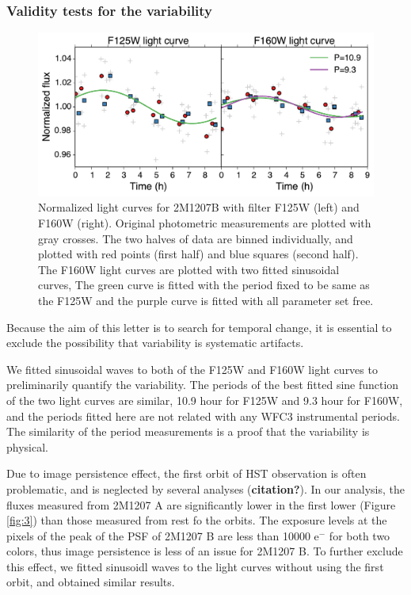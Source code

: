\documentclass[apj]{emulateapj}
\begin{document}
\subsubsection{Validity tests for the variability}

\begin{figure}
  \centering
  \includegraphics[width=\textwidth]{systematics}
  \caption{Normalized light curves for 2M1207B with filter F125W
    (left) and F160W (right). Original photometric measurements are
    plotted with gray crosses. The two halves of data are binned
    individually, and plotted with red points (first half) and blue
    squares (second half). The F160W light curves are plotted with two
  fitted sinusoidal curves, The green curve is fitted with
  the period fixed to be same as the F125W and the purple curve is
  fitted with all parameter set free.}
  \label{fig:2}
\end{figure}

Because the aim of this letter is to search for temporal change, it is
essential to exclude the possibility that variability is systematic
artifacts.

 We fitted sinusoidal waves to both of the F125W and F160W light
 curves to preliminarily quantify the variability. The periods of the
 best fitted sine function of the two light curves are similar, 10.9
 hour for F125W and 9.3 hour for F160W, and the periods fitted here
 are not related with any WFC3 instrumental periods. The similarity of
 the period measurements is a proof that the variability is physical.

 Due to image persistence effect, the first orbit of HST observation
 is often problematic, and is neglected by several analyses
 (\textbf{citation?}). In our analysis, the fluxes measured from 2M1207 A are
 significantly lower in the first lower (Figure \ref{fig:3}) than
 those measured from rest fo the orbits. The exposure levels at the
 pixels of the peak of the PSF of 2M1207 B are less than 10000 e$^{-}$
 for both two colors, thus image persistence is less of an issue for
 2M1207 B. To further exclude this effect, we fitted sinusoidl waves
 to the light curves without using the first orbit, and obtained
 similar results.
\end{document}

